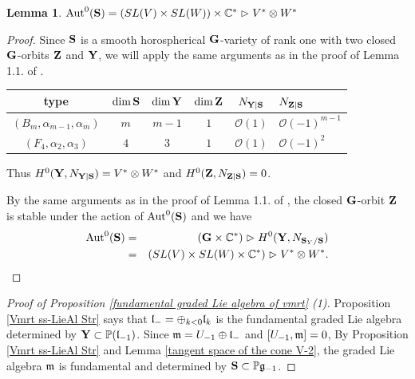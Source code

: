 \documentclass[12pt]{amsart}
\theoremstyle{plain}
\newtheorem{lemma} [theorem]{Lemma}
\theoremstyle{definition}
\def\Aut{\operatorname{Aut}}
\begin{document}
\begin{lemma} \label{automorphism group of S} $\Aut^0({\bf S}) = (SL(V) \times SL(W)) \times \mathbb C^* \vartriangleright V^* \otimes W^*$
\end{lemma}
\begin{proof}%
Since ${\bf S}$ is a smooth horospherical ${\bf G}$-variety of rank one with two closed ${\bf G}$-orbits ${\bf Z}$ and ${\bf Y}$, we will apply the same arguments as in the proof of Lemma 1.1. of \cite{Pa}.
\begin{center}
    \begin{tabular}{ c | c c c c l }
type &$\dim {\bf S}$ & $\dim {\bf Y}$ & $\dim {\bf Z}$ & $N_{{\bf Y}|{\bf S}}$ & $N_{{\bf Z}|{\bf S}}$ \\
 \hline
$(B_m, \alpha_{m-1}, \alpha_{m})$ &$m$&$m-1$&$1$& $\mathcal O(1)$&$\mathcal O(-1)^{m-1}$ \\
$(F_{4}, \alpha_{2}, \alpha_{3})$ &$4$&$3$&$1$&$\mathcal O(1)$&$\mathcal O(-1)^{2}$ \\
    \end{tabular}
\end{center}
Thus $H^0({\bf Y}, N_{{\bf Y}|{\bf S}}) =V^* \otimes W^*$ and $H^0({\bf Z}, N_{{\bf Z}|{\bf S}})=0$.

By the same arguments as in the proof of Lemma 1.1. of \cite{Pa}, the closed $\bf G$-orbit ${\bf Z} $ is stable under the action of $\Aut^0({\bf S})$ and we have
\begin{eqnarray*}
\Aut^0({\bf S}) &=& ({\bf G} \times \mathbb C^*)  \vartriangleright H^0({\bf Y}, N_{{\bf S}_Y/{\bf S}}) \\
&=& (SL(V) \times SL(W) \times \mathbb C^*)  \vartriangleright V^* \otimes W^*.
\end{eqnarray*}
\end{proof}

\begin{proof} [Proof of Proposition \ref{fundamental graded Lie algebra of vmrt} (1)]
Proposition \ref{Vmrt ss-LieAl Str} says that $\frak l_-=\oplus_{k<0}\frak l_k$ is the fundamental graded Lie algebra determined by ${\bf Y}   \subset \mathbb P(\frak l_{-1})$.
Since $\frak m = U_{-1} \oplus \frak l_-$ and $[U_{-1}, \frak m]=0$,  By Proposition \ref{Vmrt ss-LieAl Str} and Lemma \ref{tangent space of the cone V-2},  the graded Lie algebra $\frak m$ is  fundamental and determined by ${\bf S} \subset \mathbb P\frak g_{-1}$.
\end{proof}
\end{document}
